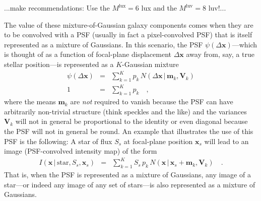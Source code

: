 \documentclass[12pt,pdftex,preprint]{aastex}
\newcommand{\tmatrix}[1]{\boldsymbol{#1}}
\newcommand{\tvector}[1]{\boldsymbol{#1}}
\newcommand{\pos}{\tvector{x}}
\newcommand{\mean}{\tvector{m}}
\newcommand{\var}{\tmatrix{V}}
\newcommand{\normal}{N}
\newcommand{\given}{\,|\,}
\renewcommand{\star}{\mathrm{star}}
\newcommand{\lux}{\mathrm{lux}}
\newcommand{\luv}{\mathrm{luv}}
\begin{document}
...make recommendations: Use the $M^{\lux}=6$ lux and the $M^{\luv}=8$
luv!...

The value of these mixture-of-Gaussian galaxy components comes when
they are to be convolved with a PSF (usually in fact a pixel-convolved
PSF) that is itself represented as a mixture of Gaussians.  In this
scenario, the PSF $\psi(\Delta\pos)$---which is thought of as a
function of focal-plane displacement $\Delta\pos$ away from, say, a
true stellar position---is represented as a $K$-Gaussian mixture
\begin{eqnarray}\displaystyle
\psi(\Delta\pos) &=& \sum_{k=1}^K p_k\,\normal(\Delta\pos\given\mean_k,\var_k)
\\
1 &=& \sum_{k=1}^K p_k
\quad ,
\end{eqnarray}
where the means $\mean_k$ are \emph{not} required to vanish because
the PSF can have arbitrarily non-trivial structure (think speckles and
the like) and the variances $\var_k$ will not in general be
proportional to the identity or even diagonal because the PSF will not
in general be round.  An example that illustrates the use of this PSF
is the following: A star of flux $S_s$ at focal-plane position
$\pos_s$ will lead to an image (PSF-convolved intensity map) of the
form
\begin{eqnarray}\displaystyle
I(\pos\given\star,S_s,\pos_s) &=& \sum_{k=1}^K S_s\,p_k\,\normal(\pos\given\pos_s+\mean_k,\var_k)
\quad .
\end{eqnarray}
That is, when the PSF is represented as a mixture of Gaussians, any
image of a star---or indeed any image of any set of stars---is also
represented as a mixture of Gaussians.
\end{document}
